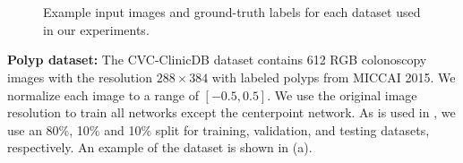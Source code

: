 	\begin{figure}[t!]
	\hfill
	 \\
	\hfill
	 \\
	\caption{Example input images and ground-truth labels for each dataset used in our experiments. \cite{bencevicTrainingPolarImage2021}}
	\label{fig:datasets}
	\end{figure}

\textbf{Polyp dataset:} The CVC-ClinicDB dataset
\cite{bernalWMDOVAMapsAccurate2015} contains 612 RGB 
colonoscopy images with the resolution $288 \times 384$ 
with labeled polyps from MICCAI 2015. We normalize each image to a range of $[-0.5, 0.5]$. 
We use the original image resolution to train all networks except the 
centerpoint network. As is used in \cite{jhaDoubleUNetDeepConvolutional2020}, 
we use an 80\%, 10\% and 10\% 
split for training, validation, and testing datasets, respectively. An example of the dataset is shown in (a).

